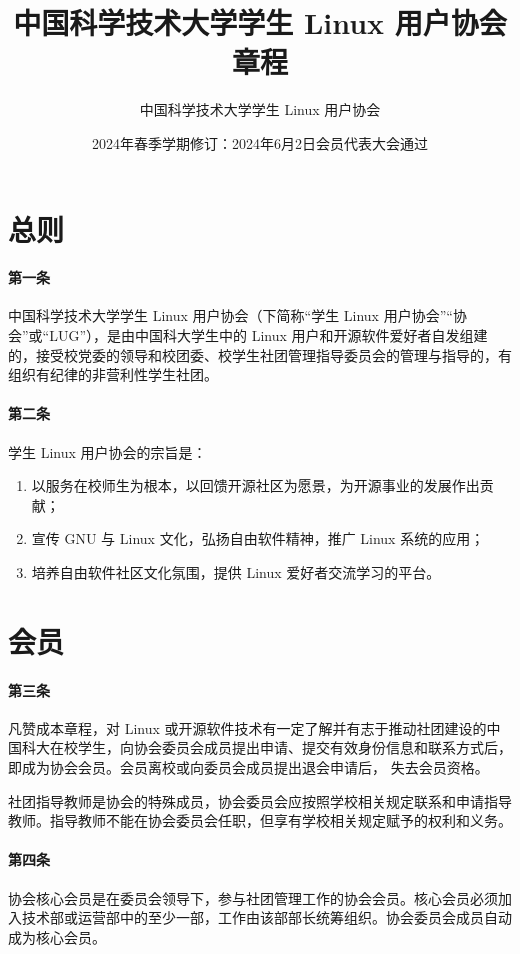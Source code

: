 \documentclass[a4paper, 12pt, twoside]{ctexart}
\title{\bfseries 中国科学技术大学学生 Linux 用户协会章程}
\author{中国科学技术大学学生 Linux 用户协会}
\date{2024年春季学期修订\draftstatus：2024年6月2日会员代表大会通过}
\begin{document}
	\maketitle
	
	\tableofcontents
	
	\pagestyle{otherpage}
	\thispagestyle{firstpage}
	
	\section{总则}
	\paragraph{第一条} 中国科学技术大学学生 Linux 用户协会（下简称“学生 Linux 用户协会”“协会”或“LUG”），是由中国科大学生中的 Linux 用户和开源软件爱好者自发组建的，接受校党委的领导和校团委、校学生社团管理指导委员会的管理与指导的，有组织有纪律的非营利性学生社团。
	
	\paragraph{第二条} 学生 Linux 用户协会的宗旨是：
	\begin{enumerate}
		\item 以服务在校师生为根本，以回馈开源社区为愿景，为开源事业的发展作出贡献；
		\item 宣传 GNU 与 Linux 文化，弘扬自由软件精神，推广 Linux 系统的应用；
		\item 培养自由软件社区文化氛围，提供 Linux 爱好者交流学习的平台。
	\end{enumerate}
	
	\section{会员}
	
	\paragraph{第三条} 凡赞成本章程，对 Linux 或开源软件技术有一定了解并有志于推动社团建设的中国科大在校学生，向协会委员会成员提出申请、提交有效身份信息和联系方式后，即成为协会会员。会员离校或向委员会成员提出退会申请后， 失去会员资格。
	
	社团指导教师是协会的特殊成员，协会委员会应按照学校相关规定联系和申请指导教师。指导教师不能在协会委员会任职，但享有学校相关规定赋予的权利和义务。
	
	\paragraph{第四条} 协会核心会员是在委员会领导下，参与社团管理工作的协会会员。核心会员必须加入技术部或运营部中的至少一部，工作由该部部长统筹组织。协会委员会成员自动成为核心会员。
	
\end{document}
